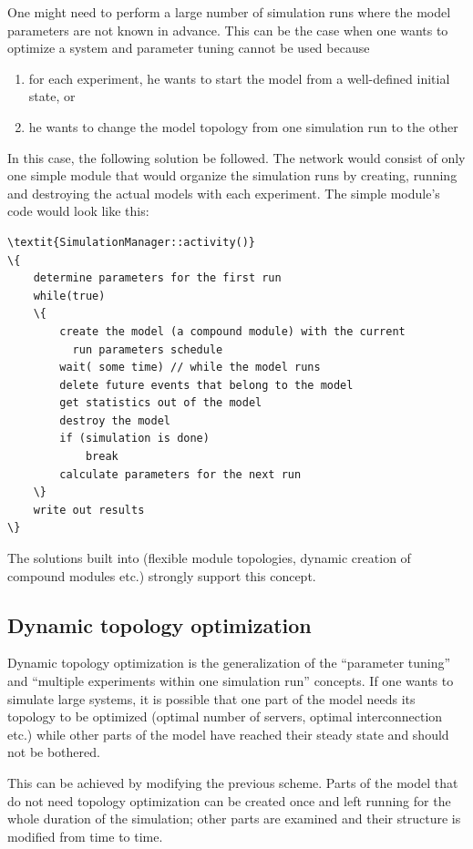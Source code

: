 One might need to perform a large number of simulation runs where
the model parameters are not known in advance. This can be the
case when one wants to optimize a system and parameter tuning
cannot be used because
\begin{enumerate}
\item{for each experiment, he wants to start the model from a
    well-defined initial state, or}
\item{he wants to change the model topology from one simulation run to
    the other}
\end{enumerate}

In this case, the following solution be followed. The network would
consist of only one simple module that would
organize the simulation runs by creating, running and destroying the
actual models with each experiment. The simple
module's code would look like this:


\begin{Verbatim}[commandchars=\\\{\}]
\textit{SimulationManager::activity()}
\{
    determine parameters for the first run
    while(true)
    \{
        create the model (a compound module) with the current
          run parameters schedule
        wait( some time) // while the model runs
        delete future events that belong to the model
        get statistics out of the model
        destroy the model
        if (simulation is done)
            break
        calculate parameters for the next run
    \}
    write out results
\}
\end{Verbatim}


The solutions built into {\opp} (flexible module topologies, dynamic
creation of compound modules etc.) strongly
support this concept.





\subsection{Dynamic topology optimization}

Dynamic topology optimization is
the generalization of the ``parameter tuning'' and ``multiple
experiments within one simulation run'' concepts. If one wants to
simulate large systems, it is possible that one part of the model
needs its topology to be optimized (optimal number of servers, optimal
interconnection etc.) while other parts of the model have reached
their steady state and should not be bothered.


This can be achieved by modifying the previous scheme. Parts
of the model that do not need topology optimization can be created
once and left running for the whole duration of the simulation;
other parts are examined and their structure is modified from
time to time.



